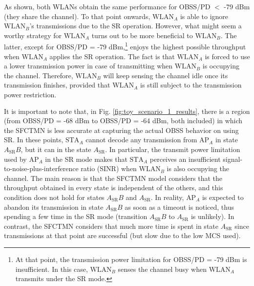 \documentclass[comsoc]{IEEEtran}
\begin{document}
	As shown, both WLANs obtain the same performance for OBSS/PD $<$ -79 dBm (they share the channel). To that point onwards, $\text{WLAN}_A$ is able to ignore $\text{WLAN}_B$'s transmissions due to the SR operation. However, what might seem a worthy strategy for $\text{WLAN}_A$ turns out to be more beneficial to $\text{WLAN}_B$. The latter, except for OBSS/PD = -79 dBm,\footnote{At that point, the transmission power limitation for OBSS/PD = -79 dBm is insufficient. In this case, $\text{WLAN}_B$ senses the channel busy when $\text{WLAN}_A$ transmits under the SR mode.} enjoys the highest possible throughput when $\text{WLAN}_A$ applies the SR operation. The fact is that $\text{WLAN}_A$ is forced to use a lower transmission power in case of transmitting when $\text{WLAN}_B$ is occupying the channel. Therefore, $\text{WLAN}_B$ will keep sensing the channel idle once its transmission finishes, provided that $\text{WLAN}_A$ is still subject to the transmission power restriction.
	
	It is important to note that, in Fig. \ref{fig:toy_scenario_1_results}, there is a region (from OBSS/PD = -68 dBm to OBSS/PD = -64 dBm, both included) in which the SFCTMN is less accurate at capturing the actual OBSS behavior on using SR. In these points, $\text{STA}_A$ cannot decode any transmission from $\text{AP}_A$ in state $A_\text{SR}B$, but it can in the state $A_\text{SR}$. In particular, the transmit power limitation used by $\text{AP}_A$ in the SR mode makes that $\text{STA}_A$ perceives an insufficient signal-to-noise-plus-interference ratio (SINR) when $\text{WLAN}_B$ is also occupying the channel. The main reason is that the SFCTMN model considers that the throughput obtained in every state is independent of the others, and this condition does not hold for states $A_\text{SR}B$ and $A_\text{SR}$. In reality, $\text{AP}_A$ is expected to abandon its transmission in state $A_\text{SR}B$ as soon as a timeout is noticed, thus spending a few time in the SR mode (transition $A_\text{SR}B$ to $A_\text{SR}$ is unlikely). In contrast, the SFCTMN considers that much more time is spent in state $A_\text{SR}$ since transmissions at that point are successful (but slow due to the low MCS used).
	
\end{document}
